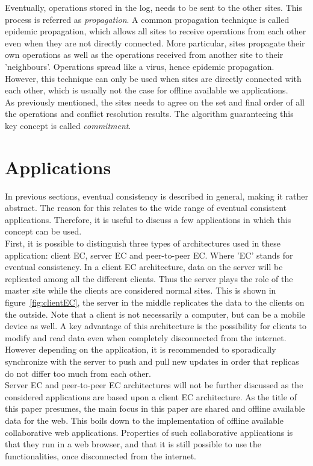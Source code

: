 \documentclass[a4paper,12pt]{report}
\begin{document}
\indent Eventually, operations stored in the log, needs to be sent to the other sites. This process is referred as \textit{propagation}. A common propagation technique is called epidemic propagation, which allows all sites to receive operations from each other even when they are not directly connected. More particular, sites propagate their own operations as well as the operations received from another site to their 'neighbours'. Operations spread like a virus, hence epidemic propagation. However, this technique can only be used when sites are directly connected with each other, which is usually not the case for offline available we applications. \\
\indent As previously mentioned, the sites needs to agree on the set and final order of all the operations and conflict resolution results. The algorithm guaranteeing this key concept is called \textit{commitment}. 

\section{Applications}

In previous sections, eventual consistency is described in general, making it rather abstract. The reason for this relates to the wide range of eventual consistent applications. Therefore, it is useful to discuss a few applications in which this concept can be used. \\
First, it is possible to distinguish three types of architectures used in these application: client EC, server EC and peer-to-peer EC. Where 'EC' stands for eventual consistency. In a client EC architecture, data on the server will be replicated among all the different clients. Thus the server plays the role of the master site while the clients are considered normal sites. This is shown in figure~\ref{fig:clientEC}, the server in the middle replicates the data to the clients on the outside. Note that a client is not necessarily a computer, but can be a mobile device as well. A key advantage of this architecture is the possibility for clients to modify and read data even when completely disconnected from the internet. However depending on the application, it is recommended to sporadically synchronize with the server to push and pull new updates in order that replicas do not differ too much from each other. \\
Server EC and peer-to-peer EC architectures will not be further discussed as the considered applications are based upon a client EC architecture. As the title of this paper presumes, the main focus in this paper are shared and offline available data for the web. This boils down to the implementation of offline available collaborative web applications. Properties of such collaborative applications is that they run in a web browser, and that it is still possible to use the functionalities, once disconnected from the internet. 
\end{document}

